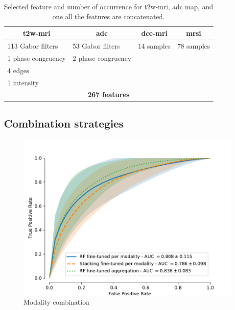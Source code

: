 \documentclass[a4paper,num-refs]{wiley-article}
\begin{document}
\begin{table}
  \caption{Selected feature and number of occurrence for \acs*{t2w}-\acs*{mri}, \acs*{adc} map, and one all the features are concatenated.}
  \centering
  \scriptsize
  \begin{tabular}{llll}
    \toprule
    \multicolumn{1}{c}{\textbf{\acs*{t2w}-\acs*{mri}}} & \multicolumn{1}{c}{\textbf{\acs*{adc}}} & \multicolumn{1}{c}{\textbf{\acs*{dce}-\acs*{mri}}} & \multicolumn{1}{c}{\textbf{\acs*{mrsi}}} \\
    \midrule
    113 Gabor filters & 53 Gabor filters & 14 samples  & 78 samples \\
    1 phase congruency & 2 phase congruency & & \\ 
    4 edges & & & \\
    1 intensity & & & \\
    \midrule
    \multicolumn{4}{c}{\textbf{267 features}} \\
    \bottomrule
  \end{tabular}
  \label{tab:selfeatocc}
\end{table}

\subsection{Combination strategies}

\begin{figure}
  \centering
  \includegraphics[width=.45\textwidth]{images/combine_all.pdf}  
  \caption[modality combination] {Modality combination}
  \label{fig:modality-combination}
\end{figure}


\end{document}
